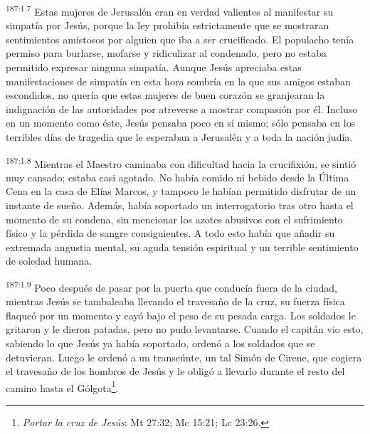 \par 
\textsuperscript{187:1.7} Estas mujeres de Jerusalén eran en verdad valientes al manifestar su simpatía por Jesús, porque la ley prohibía estrictamente que se mostraran sentimientos amistosos por alguien que iba a ser crucificado. El populacho tenía permiso para burlarse, mofarse y ridiculizar al condenado, pero no estaba permitido expresar ninguna simpatía. Aunque Jesús apreciaba estas manifestaciones de simpatía en esta hora sombría en la que sus amigos estaban escondidos, no quería que estas mujeres de buen corazón se granjearan la indignación de las autoridades por atreverse a mostrar compasión por él. Incluso en un momento como éste, Jesús pensaba poco en sí mismo; sólo pensaba en los terribles días de tragedia que le esperaban a Jerusalén y a toda la nación judía.

\par 
\textsuperscript{187:1.8} Mientras el Maestro caminaba con dificultad hacia la crucifixión, se sintió muy cansado; estaba casi agotado. No había comido ni bebido desde la Última Cena en la casa de Elías Marcos, y tampoco le habían permitido disfrutar de un instante de sueño. Además, había soportado un interrogatorio tras otro hasta el momento de su condena, sin mencionar los azotes abusivos con el sufrimiento físico y la pérdida de sangre consiguientes. A todo esto había que añadir su extremada angustia mental, su aguda tensión espiritual y un terrible sentimiento de soledad humana.

\par 
\textsuperscript{187:1.9} Poco después de pasar por la puerta que conducía fuera de la ciudad, mientras Jesús se tambaleaba llevando el travesaño de la cruz, su fuerza física flaqueó por un momento y cayó bajo el peso de su pesada carga. Los soldados le gritaron y le dieron patadas, pero no pudo levantarse. Cuando el capitán vio esto, sabiendo lo que Jesús ya había soportado, ordenó a los soldados que se detuvieran. Luego le ordenó a un transeúnte, un tal Simón de Cirene, que cogiera el travesaño de los hombros de Jesús y le obligó a llevarlo durante el resto del camino hasta el Gólgota\footnote{\textit{Portar la cruz de Jesús}: Mt 27:32; Mc 15:21; Lc 23:26.}.


